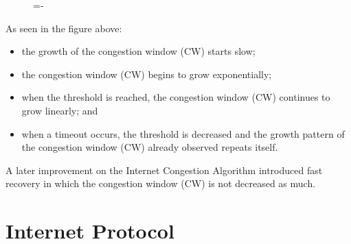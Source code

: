 \documentclass[a4paper]{systems-software}
\begin{document}
\begin{figure}[H]
	\lineskip=-\fboxrule
\end{figure}

As seen in the figure above:
\begin{itemize}
	\item the growth of the congestion window (CW) starts slow;
	\item the congestion window (CW) begins to grow exponentially;
	\item when the threshold is reached, the congestion window (CW) continues to grow linearly; and
	\item when a timeout occurs, the threshold is decreased and the growth pattern of the congestion window (CW) already observed repeats itself.
\end{itemize}

A later improvement on the Internet Congestion Algorithm introduced fast recovery in which the congestion window (CW) is not decreased as much.


\chapter{Internet Protocol}
\end{document}
